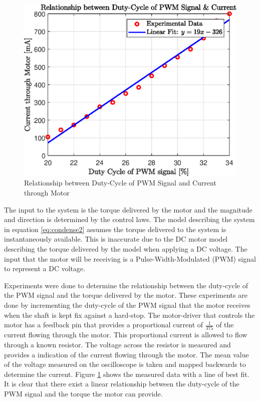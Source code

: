 \begin{figure}[h]
	\centering
	\includegraphics[scale=1]{./figs/dutycycle_vs_current.eps}
	\caption{Relationship between Duty-Cycle of PWM Signal and Current through Motor}
	\label{fig:dutycycle_vs_current}
\end{figure}

The input to the system is the torque delivered by the motor and the magnitude and direction is determined by the control laws. The model describing the system in equation \ref{eq:condense2} assumes the torque delivered to the system is instantaneously available. This is inaccurate due to the DC motor model describing the torque delivered by the model when applying a DC voltage. The input that the motor will be receiving is a Pulse-Width-Modulated (PWM) signal to represent a DC voltage.

Experiments were done to determine the relationship between the duty-cycle of the PWM signal and the torque delivered by the motor. These experiments are done by incrementing the duty-cycle of the PWM signal that the motor receives when the shaft is kept fix against a hard-stop. The motor-driver that controls the motor has a feedback pin that provides a proportional current of $\frac{1}{375}$ of the current flowing through the motor. This proportional current is allowed to flow through a known resistor. The voltage across the resistor is measured and provides a indication of the current flowing through the motor. The mean value of the voltage measured on the oscilloscope is taken and mapped backwards to determine the current. Figure \ref{fig:dutycycle_vs_current} shows the measured data with a line of best fit. It is clear that there exist a linear relationship between the duty-cycle of the PWM signal and the torque the motor can provide.